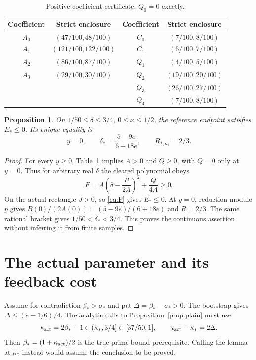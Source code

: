 \documentclass[11pt,a4paper]{article}
\newtheorem{proposition}[theorem]{Proposition}
\theoremstyle{definition}
\newcommand{\bet}{\beta_*}
\newcommand{\sig}{\sigma_*}
\begin{document}
\begin{table}[ht]
\centering
\begin{tabular}{@{}cccc@{}}
\toprule Coefficient & Strict enclosure & Coefficient & Strict enclosure\\
\midrule
$A_0$ & $(47/100,48/100)$ & $C_0$ & $(7/100,8/100)$\\
$A_1$ & $(121/100,122/100)$ & $C_1$ & $(6/100,7/100)$\\
$A_2$ & $(86/100,87/100)$ & $Q_1$ & $(4/100,5/100)$\\
$A_3$ & $(29/100,30/100)$ & $Q_2$ & $(19/100,20/100)$\\
 & & $Q_3$ & $(26/100,27/100)$\\
 & & $Q_4$ & $(7/100,8/100)$\\
\bottomrule
\end{tabular}
\caption{Positive coefficient certificate; $Q_0=0$ exactly.}
\label{tab:signs}
\end{table}

\begin{proposition}\label{prop:certificate}
On $1/50\le\delta\le3/4$, $0\le x\le1/2$, the reference
endpoint satisfies $E_*\le0$. Its unique equality is
\[
 y=0,\qquad \delta_*=\frac{5-9e}{6+18e},\qquad
 R_{*,\kappa_*}=2/3 .
\]
\end{proposition}
\begin{proof}
For every $y\ge0$, Table~\ref{tab:signs} implies $A>0$ and
$Q\ge0$, with $Q=0$ only at $y=0$. Thus for arbitrary real
$\delta$ the cleared polynomial obeys
\[
 F=A\left(\delta-\frac B{2A}\right)^2+\frac Q{4A}\ge0 .
\]
On the actual rectangle $J>0$, so \eqref{eq:F} gives $E_*\le0$.
At $y=0$, reduction modulo $p$ gives
$B(0)/(2A(0))=(5-9e)/(6+18e)$ and $R=2/3$.
The same rational bracket gives $1/50<\delta_*<3/4$.
This proves the continuous assertion without inferring it from
finite samples.
\end{proof}

\section{The actual parameter and its feedback cost}
\label{sec:feedback}
Assume for contradiction $\bet>\sig$ and put $\Delta=\bet-\sig>0$.
The bootstrap gives $\Delta\le(e-1/6)/4$.
The analytic calls to Proposition~\ref{prop:plain} must use
\begin{equation}\label{eq:actual}
 \kappa_{\rm act}=2\bet-1\in(\kappa_*,3/4]\subset[37/50,1],
 \qquad \kappa_{\rm act}-\kappa_*=2\Delta .
\end{equation}
Then $\bet=(1+\kappa_{\rm act})/2$ is the true prime-bound
prerequisite. Calling the lemma at $\kappa_*$ instead would
assume the conclusion to be proved.
\end{document}
